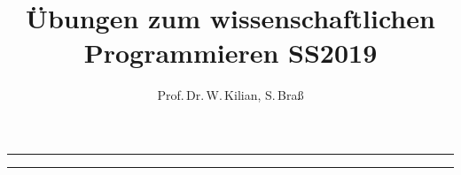 \setlength{\parindent}{0cm}
\setlength{\topmargin}{0in}
\setlength{\headheight}{0cm}
\setlength{\headsep}{0cm}
\setlength{\textheight}{9.0in}
\setlength{\evensidemargin}{0.0in}
\setlength{\oddsidemargin}{0.0in}
\setlength{\textwidth}{6in}
\setlength{\footskip}{.8in}

\title{\textsf{\textbf{Übungen zum wissenschaftlichen Programmieren SS2019}}}
\author{Prof.\,Dr.\,W.\,Kilian\unskip, S.\,Braß}

\ExplSyntaxOn
\RenewDocumentCommand \maketitlehooka {} {
  \rule{\textwidth}{1pt}
}
\RenewDocumentCommand \maketitlehookd {} {
  \rule{\textwidth}{1pt}
}
\RenewDocumentCommand \maketitlehookc {} {
  \begin{center}
    \large \AufgabenBlatt
  \end{center}
}
\NewDocumentCommand \I {}
{
}
\NewDocumentCommand \Sp {}
{
}
\NewDocumentCommand \adj {}
{
}
\ExplSyntaxOff
